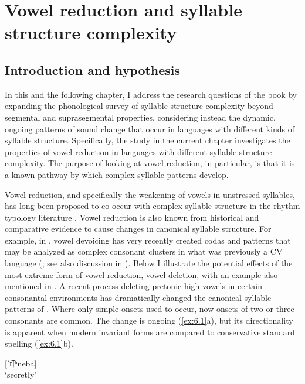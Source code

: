 \chapter{Vowel reduction and syllable structure complexity}\label{sec:6}
\section{Introduction and hypothesis}\label{sec:6.1}

  In this and the following chapter, I address the research questions of the book by expanding the phonological survey of syllable structure complexity beyond segmental and suprasegmental properties, considering instead the dynamic, ongoing patterns of sound change that occur in languages with different kinds of syllable structure. Specifically, the study in the current chapter investigates the properties of vowel reduction in languages with different syllable structure complexity. The purpose of looking at vowel reduction, in particular, is that it is a known pathway by which complex syllable patterns develop.

  Vowel reduction, and specifically the weakening of vowels in unstressed syllables, has long been proposed to co-occur with complex syllable structure in the rhythm typology literature \citep{Auer1993}. Vowel reduction is also known from historical and comparative evidence to cause changes in canonical syllable structure. For example, in , vowel devoicing has very recently created codas and patterns that may be analyzed as complex consonant clusters in what was previously a CV language (\citealt{Givón2011}; see also discussion in ). Below I illustrate the potential effects of the most extreme form of vowel reduction, vowel deletion, with an example also mentioned in . A recent process deleting pretonic high vowels in certain consonantal environments has dramatically changed the canonical syllable patterns of . Where only simple onsets used to occur, now onsets of two or three consonants are common. The change is ongoing (\ref{ex:6.1}a), but its directionality is apparent when modern invariant forms are compared to conservative standard spelling (\ref{ex:6.1}b).

\ea\label{ex:6.1}
  
\ea\relax  [t͡ʃʰiˈneba] {\textasciitilde} [ˈt͡ʃʰneba]\\
\glt `secretly’

